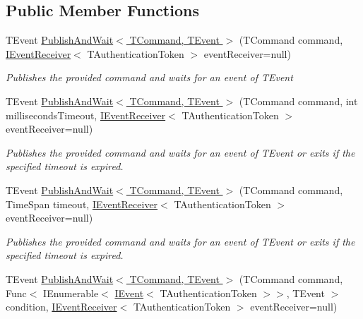 \subsection*{Public Member Functions}
\begin{DoxyCompactItemize}
\item 
T\+Event \hyperlink{interfaceCqrs_1_1Commands_1_1IPublishAndWaitCommandPublisher_a19ffb318c830e9f05d4adae985232f30_a19ffb318c830e9f05d4adae985232f30}{Publish\+And\+Wait$<$ T\+Command, T\+Event $>$} (T\+Command command, \hyperlink{interfaceCqrs_1_1Events_1_1IEventReceiver}{I\+Event\+Receiver}$<$ T\+Authentication\+Token $>$ event\+Receiver=null)
\begin{DoxyCompactList}\small\item\em Publishes the provided {\itshape command}  and waits for an event of {\itshape T\+Event}  \end{DoxyCompactList}\item 
T\+Event \hyperlink{interfaceCqrs_1_1Commands_1_1IPublishAndWaitCommandPublisher_ad3761879cf9e09c9e89cabf8067b6de4_ad3761879cf9e09c9e89cabf8067b6de4}{Publish\+And\+Wait$<$ T\+Command, T\+Event $>$} (T\+Command command, int milliseconds\+Timeout, \hyperlink{interfaceCqrs_1_1Events_1_1IEventReceiver}{I\+Event\+Receiver}$<$ T\+Authentication\+Token $>$ event\+Receiver=null)
\begin{DoxyCompactList}\small\item\em Publishes the provided {\itshape command}  and waits for an event of {\itshape T\+Event}  or exits if the specified timeout is expired. \end{DoxyCompactList}\item 
T\+Event \hyperlink{interfaceCqrs_1_1Commands_1_1IPublishAndWaitCommandPublisher_a02ef39482cb50e6e15e06144adca1ed5_a02ef39482cb50e6e15e06144adca1ed5}{Publish\+And\+Wait$<$ T\+Command, T\+Event $>$} (T\+Command command, Time\+Span timeout, \hyperlink{interfaceCqrs_1_1Events_1_1IEventReceiver}{I\+Event\+Receiver}$<$ T\+Authentication\+Token $>$ event\+Receiver=null)
\begin{DoxyCompactList}\small\item\em Publishes the provided {\itshape command}  and waits for an event of {\itshape T\+Event}  or exits if the specified timeout is expired. \end{DoxyCompactList}\item 
T\+Event \hyperlink{interfaceCqrs_1_1Commands_1_1IPublishAndWaitCommandPublisher_a83e4480bf8cd6015254d700056cf1647_a83e4480bf8cd6015254d700056cf1647}{Publish\+And\+Wait$<$ T\+Command, T\+Event $>$} (T\+Command command, Func$<$ I\+Enumerable$<$ \hyperlink{interfaceCqrs_1_1Events_1_1IEvent}{I\+Event}$<$ T\+Authentication\+Token $>$$>$, T\+Event $>$ condition, \hyperlink{interfaceCqrs_1_1Events_1_1IEventReceiver}{I\+Event\+Receiver}$<$ T\+Authentication\+Token $>$ event\+Receiver=null)
$$
\end{DoxyCompactItemize}
